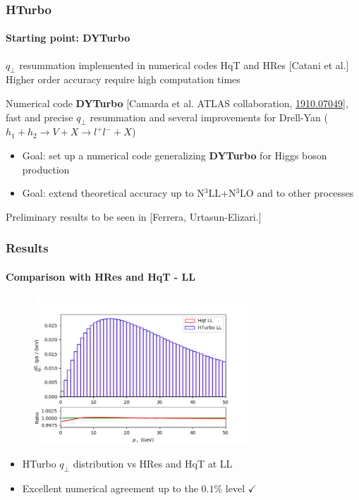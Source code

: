 \documentclass[aspectratio=43]{beamer}
\begin{document}
\begin{frame}

	\frametitle{HTurbo}
	\framesubtitle{Starting point: DYTurbo}

	\footnotesize $q_{\perp}$ resummation implemented in numerical codes HqT and HRes {\color{blue}[Catani et al.]} \\
	\footnotesize Higher order accuracy require {\color{red}high computation times}
	
	\vspace{0.5cm}

	\footnotesize Numerical code \textbf{DYTurbo} {\color{blue}[Camarda et al. ATLAS collaboration, {\color{blue} \href{https://arxiv.org/abs/1910.07049}{1910.07049}}]},\\
	fast and precise $q_{\perp}$ resummation and several improvements for Drell-Yan ($h_{1} + h_{2} \rightarrow V + X \rightarrow l^{+}l^{-} + X$)

	\begin{itemize}
		\item \footnotesize {\color{red}Goal}: set up a numerical code generalizing  \textbf{DYTurbo} for Higgs boson production
		\item \footnotesize {\color{red}Goal}: extend theoretical accuracy up to N$^{3}$LL+N$^{3}$LO and to other processes
	\end{itemize}

	\vspace{0.5cm}
	
	\footnotesize Preliminary results to be seen in {\color{blue}[Ferrera, Urtasun-Elizari.]} \\
	
\end{frame}

\begin{frame}
	
	\frametitle{Results}
	\framesubtitle{Comparison with HRes and HqT - LL}
	
	\begin{figure}
		\includegraphics[width = 8cm]{plots/hturbo_LL.png}
	\end{figure}
	
	\begin{itemize}
		\item \footnotesize HTurbo $q_{\perp}$ distribution vs HRes and HqT at LL
		\item \footnotesize Excellent numerical agreement up to the $0.1\%$ level {\color{darkgreen}$\checkmark$} 
	\end{itemize}

\end{frame}
\end{document}
